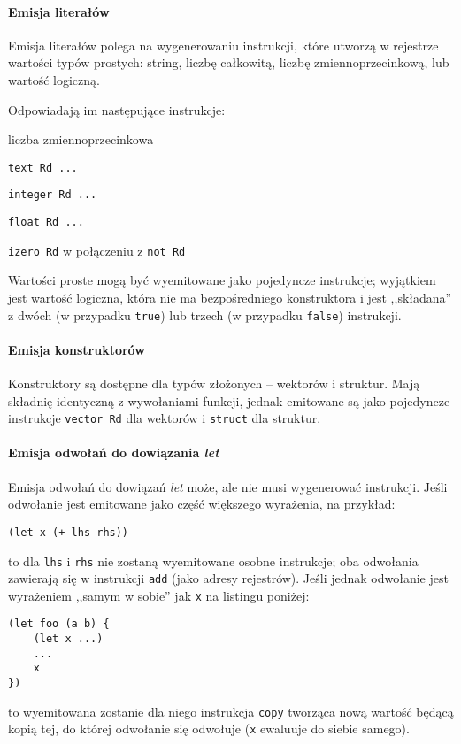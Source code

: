 \paragraph{Emisja literałów}

Emisja literałów polega na wygenerowaniu instrukcji, które utworzą w rejestrze
wartości typów prostych: string, liczbę całkowitą, liczbę zmiennoprzecinkową, lub
wartość logiczną.

Odpowiadają im następujące instrukcje:

\begin{labeling}{liczba zmiennoprzecinkowa}
\item[string] \texttt{text Rd ...}
\item[liczba całkowita] \texttt{integer Rd ...}
\item[liczba zmiennoprzecinkowa] \texttt{float Rd ...}
\item[wartość logiczna] \texttt{izero Rd} w połączeniu z \texttt{not Rd}
\end{labeling}

Wartości proste mogą być wyemitowane jako pojedyncze instrukcje; wyjątkiem jest
wartość logiczna, która nie ma bezpośredniego konstruktora i jest ,,składana'' z
dwóch (w przypadku \texttt{true}) lub trzech (w przypadku \texttt{false})
instrukcji.

\paragraph{Emisja konstruktorów}

Konstruktory są dostępne dla typów złożonych -- wektorów i struktur. Mają
składnię identyczną z wywołaniami funkcji, jednak emitowane są jako pojedyncze
instrukcje \texttt{vector Rd} dla wektorów i \texttt{struct} dla struktur.

\paragraph{Emisja odwołań do dowiązania \emph{let}}

Emisja odwołań do dowiązań \emph{let} może, ale nie musi wygenerować instrukcji.
Jeśli odwołanie jest emitowane jako część większego wyrażenia, na przykład:
\begin{lstlisting}
(let x (+ lhs rhs))
\end{lstlisting}
to dla \texttt{lhs} i \texttt{rhs} nie zostaną wyemitowane osobne instrukcje;
oba odwołania zawierają się w instrukcji \texttt{add} (jako adresy rejestrów).
Jeśli jednak odwołanie jest wyrażeniem ,,samym w sobie'' jak \texttt{x} na
listingu poniżej:
\begin{lstlisting}
(let foo (a b) {
    (let x ...)
    ...
    x
})
\end{lstlisting}
to wyemitowana zostanie dla niego instrukcja \texttt{copy} tworząca nową wartość
będącą kopią tej, do której odwołanie się odwołuje (\texttt{x} ewaluuje do
siebie samego).

